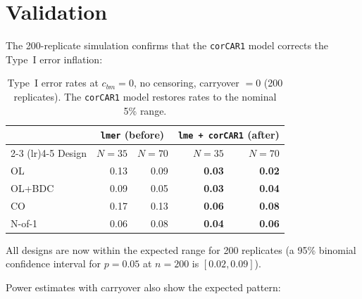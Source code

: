 \documentclass[11pt]{article}
\begin{document}
\section{Validation}

The 200-replicate simulation confirms that the \texttt{corCAR1}
model corrects the Type~I error inflation:

\begin{table}[h]
\centering
\caption{Type~I error rates at $c_{bm} = 0$, no censoring,
  carryover $= 0$ (200 replicates). The \texttt{corCAR1}
  model restores rates to the nominal 5\% range.}
\begin{tabular}{lrrrr}
\toprule
& \multicolumn{2}{c}{\texttt{lmer} (before)}
& \multicolumn{2}{c}{\texttt{lme + corCAR1} (after)} \\
\cmidrule(lr){2-3} \cmidrule(lr){4-5}
Design & $N = 35$ & $N = 70$ & $N = 35$ & $N = 70$ \\
\midrule
OL & 0.13 & 0.09 & \textbf{0.03} & \textbf{0.02} \\
OL+BDC & 0.09 & 0.05 & \textbf{0.03} & \textbf{0.04} \\
CO & 0.17 & 0.13 & \textbf{0.06} & \textbf{0.08} \\
N-of-1 & 0.06 & 0.08 & \textbf{0.04} & \textbf{0.06} \\
\bottomrule
\end{tabular}
\end{table}

All designs are now within the expected range for 200
replicates (a 95\% binomial confidence interval for
$p = 0.05$ at $n = 200$ is $[0.02, 0.09]$).

Power estimates with carryover also show the expected
pattern:
\end{document}
